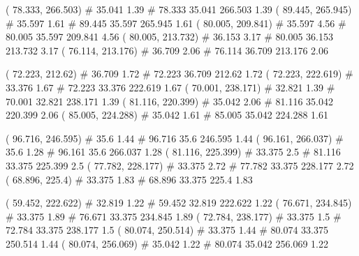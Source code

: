 \documentclass[a4paper,openbib,10pt]{article}
\newenvironment{treegraph}{\begin{graph}}{\end{graph}}
\begin{document}
\begin{treegraph}
  ( 78.333, 266.503) #     35.041    1.39
   #    78.333    35.041    266.503    1.39
  ( 89.445, 265.945) #     35.597    1.61
   #    89.445    35.597    265.945    1.61
  ( 80.005, 209.841) #     35.597    4.56
   #    80.005    35.597    209.841    4.56
  ( 80.005, 213.732) #     36.153    3.17
   #    80.005    36.153    213.732    3.17
  ( 76.114, 213.176) #     36.709    2.06
   #    76.114    36.709    213.176    2.06

  ( 72.223, 212.62) #     36.709    1.72
   #    72.223    36.709    212.62    1.72
  ( 72.223, 222.619) #     33.376    1.67
   #    72.223    33.376    222.619    1.67
  ( 70.001, 238.171) #     32.821    1.39
   #    70.001    32.821    238.171    1.39
  ( 81.116, 220.399) #     35.042    2.06
   #    81.116    35.042    220.399    2.06
  ( 85.005, 224.288) #     35.042    1.61
   #    85.005    35.042    224.288    1.61

  ( 96.716, 246.595) #     35.6    1.44
   #    96.716    35.6    246.595    1.44
  ( 96.161, 266.037) #     35.6    1.28
   #    96.161    35.6    266.037    1.28
  ( 81.116, 225.399) #     33.375    2.5
   #    81.116    33.375    225.399    2.5
  ( 77.782, 228.177) #     33.375    2.72
   #    77.782    33.375    228.177    2.72
  ( 68.896, 225.4) #     33.375    1.83
   #    68.896    33.375    225.4    1.83

  ( 59.452, 222.622) #     32.819    1.22
   #    59.452    32.819    222.622    1.22
  ( 76.671, 234.845) #     33.375    1.89
   #    76.671    33.375    234.845    1.89
  ( 72.784, 238.177) #     33.375    1.5
   #    72.784    33.375    238.177    1.5
  ( 80.074, 250.514) #     33.375    1.44
   #    80.074    33.375    250.514    1.44
  ( 80.074, 256.069) #     35.042    1.22
   #    80.074    35.042    256.069    1.22


\end{treegraph}
\end{document}
